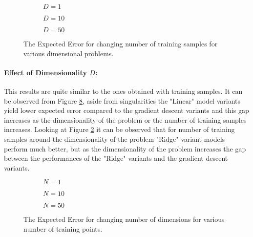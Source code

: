 \begin{figure}[!h]
  \centering
    \begin{subfigure}{0.3\textwidth}
      \centering
      \caption{$D=1$}
      \label{fig:linear-N-D-1}
    \end{subfigure}
    \begin{subfigure}{0.3\textwidth}
      \centering
      \caption{$D=10$}
      \label{fig:linear-N-D-10}
    \end{subfigure}
    \begin{subfigure}{0.3\textwidth}
      \centering
      \caption{$D=50$}
      \label{fig:linear-N-D-50}
    \end{subfigure}
  \caption{The Expected Error for changing number of training samples for various dimensional problems.}\label{fig:linear-N}
\end{figure}


\paragraph{Effect of Dimensionality $D$:} This results are quite similar to the ones obtained with training samples. It can be observed from Figure \ref{fig:linear-D}, aside from singularities the "Linear" model variants yield lower expected error compared to the gradient descent variants and this gap increases as the dimensionality of the problem or the number of training samples increases. Looking at Figure \ref{fig:linear-N-D-10} it can be observed that for number of training samples around the dimensionality of the problem "Ridge" variant models perform much better, but as the dimensionality of the problem increases the gap between the performances of the "Ridge" variants and the gradient descent variants.

\begin{figure}[!h]
  \centering
    \begin{subfigure}{0.3\textwidth}
      \centering
      \caption{$N=1$}
      \label{fig:linear-D-N-1}
    \end{subfigure}
    \begin{subfigure}{0.3\textwidth}
      \centering
      \caption{$N=10$}
      \label{fig:linear-D-N-10}
    \end{subfigure}
    \begin{subfigure}{0.3\textwidth}
      \centering
      \caption{$N=50$}
      \label{fig:linear-D-N-50}
    \end{subfigure}
  \caption{The Expected Error for changing number of dimensions for various number of training points.}\label{fig:linear-D}
\end{figure}


